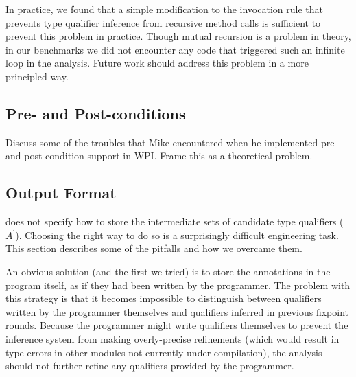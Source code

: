 In practice, we found that a simple modification to the invocation rule that
prevents type qualifier inference from recursive method calls is sufficient
to prevent this problem in practice. Though mutual recursion is a problem in
theory, in our benchmarks we did not encounter any code that triggered such
an infinite loop in the analysis. Future work should address this problem in
a more principled way.

\subsection{Pre- and Post-conditions}
\label{sec:pre-post-conditions}

Discuss some of the troubles that Mike encountered when
he implemented pre- and post-condition support in WPI\@. Frame
this as a theoretical problem. 

\subsection{Output Format}
\label{sec:output}


 does not specify how to store the intermediate
sets of candidate type qualifiers (\ie $A^{\prime}$). Choosing the right way
to do so is a surprisingly difficult engineering task. This section describes some
of the pitfalls and how we overcame them.

An obvious solution (and the first we tried) is to store the annotations
in the program itself, as if they had been written by the programmer. The
problem with this strategy is that it becomes impossible to distinguish
between qualifiers written by the programmer themselves and qualifiers
inferred in previous fixpoint rounds. Because the programmer might write
qualifiers themselves to prevent the inference system from making overly-precise
refinements (which would result in type errors in \eg other modules not currently
under compilation), the analysis should not further refine any qualifiers
provided by the programmer.


